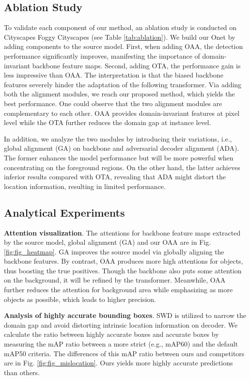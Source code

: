 \documentclass[sigconf]{acmart}
\begin{document}
\subsection{Ablation Study} 
To validate each component of our method, an ablation study is conducted on Cityscapes  Foggy Cityscapes (see Table \ref{tab:ablation}). We build our Onet by adding components to the source model. First, when adding OAA, the detection performance significantly improves, manifesting the importance of domain-invariant backbone feature maps. Second, adding OTA, the performance gain is less impressive than OAA. The interpretation is that the biased backbone features severely hinder the adaptation of the following transformer. Via adding both the alignment modules, we reach our proposed method, which yields the best performance. One could observe that the two alignment modules are complementary to each other. OAA provides domain-invariant features at pixel level while the OTA further reduces the domain gap at instance level.

In addition, we analyze the two modules by introducing their variations, i.e., global alignment (GA) on backbone and adversarial decoder alignment (ADA). The former enhances the model performance but will be more powerful when concentrating on the foreground regions. On the other hand, the latter achieves inferior results compared with OTA, revealing that ADA might distort the location information, resulting in limited performance.

\subsection{Analytical Experiments}

\textbf{Attention visualization}. 
The attentions for backbone feature maps extracted by the source model, global alignment (GA) and our OAA are in Fig. \ref{fig:fig_heatmap}. GA improves the source model via globally aligning the backbone features. By contrast, OAA produces more high attentions for objects, thus boosting the true positives. Though the backbone also puts some attention on the background, it will be refined by the transformer. Meanwhile, OAA further reduces the attention for background area while emphasizing as more objects as possible, which leads to higher precision.

\textbf{Analysis of highly accurate bounding boxes}.
\label{mislocation}
SWD is utilized to narrow the domain gap and avoid distorting intrinsic location information on decoder. We calculate the ratio between highly accurate boxes and accurate boxes by measuring the mAP ratio between a more strict (e.g., mAP60) and the default mAP50 criteria. The differences of this mAP ratio between ours and competitors are in Fig. \ref{fig:fig_mislocation}. Ours yields more highly accurate predictions than others.
\end{document}
